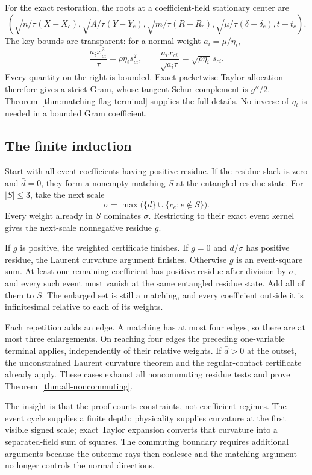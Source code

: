 For the exact restoration, the roots at a coefficient-field stationary
center are
\[
 \left(\sqrt{n/\tau}(X-X_c),\sqrt{A/\tau}(Y-Y_c),
 \sqrt{m/\tau}(R-R_c),\sqrt{\mu/\tau}(\delta-\delta_c),t-t_c\right).
\]
The key bounds are transparent: for a normal weight $a_i=\mu/\eta_i$,
\[
 \frac{a_ix_{ci}^2}{\tau}=\rho\eta_i s_{ci}^2,
 \qquad
 \frac{a_ix_{ci}}{\sqrt{a_i\tau}}=\sqrt{\rho\eta_i}\,s_{ci}.
\]
Every quantity on the right is bounded.  Exact packetwise Taylor allocation
therefore gives a strict Gram, whose tangent Schur complement is $g''/2$.
Theorem~\ref{thm:matching-flag-terminal} supplies the full details.  No inverse
of $\eta_i$ is needed in a bounded Gram coefficient.

\subsection{The finite induction}
Start with all event coefficients having positive residue.  If the residue
slack is zero and $\bar d=0$, they form a nonempty matching $S$ at the
entangled residue state.  For $|S|\leq3$, take the next scale
\[
             \sigma=\max\bigl(\{d\}\cup\{c_e:e\notin S\}\bigr).
\]
Every weight already in $S$ dominates $\sigma$.  Restricting to their exact
event kernel gives the next-scale nonnegative residue $g$.

If $g$ is positive, the weighted certificate finishes.  If $g=0$ and
$d/\sigma$ has positive residue, the Laurent curvature argument finishes.
Otherwise $g$ is an event-square sum.  At least one remaining coefficient
has positive residue after division by $\sigma$, and every such event must
vanish at the same entangled residue state.  Add all of them to $S$.
The enlarged set is still a matching, and every coefficient outside it is
infinitesimal relative to each of its weights.

Each repetition adds an edge.  A matching has at most four edges, so there
are at most three enlargements.  On reaching four edges the preceding
one-variable terminal applies, independently of their relative weights.
If $\bar d>0$ at the outset, the unconstrained Laurent curvature theorem
and the regular-contact certificate already apply.  These cases exhaust
all noncommuting residue tests and prove Theorem~\ref{thm:all-noncommuting}.

The insight is that the proof counts constraints, not coefficient regimes.
The event cycle supplies a finite depth; physicality supplies curvature at
the first visible signed scale; exact Taylor expansion converts that
curvature into a separated-field sum of squares.  The commuting boundary
requires additional arguments because the outcome rays then coalesce and
the matching argument no longer controls the normal directions.
